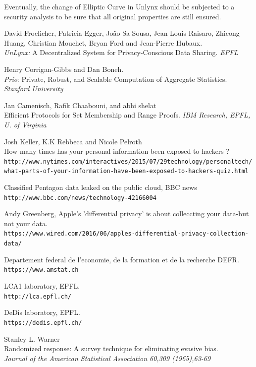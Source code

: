 \documentclass{article}
\begin{document}
Eventually, the change of Elliptic Curve in Unlynx should be subjected to a security analysis to be sure that all original properties are still ensured.
\newpage

\begin{thebibliography}{9}

David Froelicher, Patricia Egger, João Sa Sousa, Jean Louis Raisaro, Zhicong Huang, Christian Mouchet, Bryan Ford and Jean-Pierre Hubaux.\\
\textit{UnLynx:} A Decentralized System for Privacy-Conscious Data Sharing. 
\textit{EPFL}
 
Henry Corrigan-Gibbs and Dan Boneh.\\
\textit{Prio}: Private, Robust, and Scalable Computation of Aggregate Statistics.
\textit{Stanford University}


Jan Camenisch, Rafik Chaabouni, and abhi shelat\\
Efficient Protocols for Set Membership and Range Proofs.
\textit{IBM Research, EPFL, U. of Virginia}

Josh Keller, K.K Rebbeca and Nicole Pelroth\\
How many times has your personal information been exposed to hackers ?
\\\texttt{http://www.nytimes.com/interactives/2015/07/29technology/personaltech/what-parts-of-your-information-have-been-exposed-to-hackers-quiz.html}

Classified Pentagon data leaked on the public cloud, BBC news
\\\texttt{http://www.bbc.com/news/technology-42166004}

Andy Greenberg, Apple's 'differential privacy' is about colleccting your data-but not your data.
\\\texttt{https://www.wired.com/2016/06/apples-differential-privacy-collection-data/}

Departement federal de l'economie, de la formation et de la recherche DEFR.
\\\texttt{https://www.amstat.ch}

LCA1 laboratory, EPFL.
\\\texttt{http://lca.epfl.ch/}

DeDis laboratory, EPFL.
\\\texttt{https://dedis.epfl.ch/}

Stanley L. Warner\\
Randomized response: A survey technique for eliminating evasive bias.\\
\textit{Journal of the American Statistical Association 60,309 (1965),63-69}


\end{thebibliography}
\end{document}

